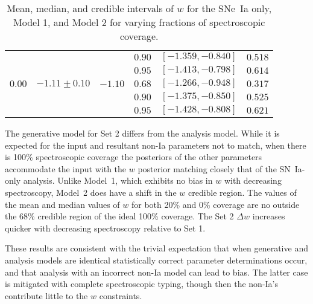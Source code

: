 \documentclass[preprint,3p]{elsarticle}
\begin{document}
\begin{table}
\begin{tabular}{|c|cc|ccc|}
& & &$0.90$ & $[-1.359, -0.840]$ & $0.518$ \\
& & &$0.95$ & $[-1.413, -0.798]$ & $0.614$ \\
\hline
$0.00$ &$-1.11 \pm  0.10$ & $-1.10$ &$0.68$ & $[-1.266, -0.948]$ & $0.317$ \\
& & &$0.90$ & $[-1.375, -0.850]$ & $0.525$ \\
& & &$0.95$ & $[-1.428, -0.808]$ & $0.621$ \\
\hline
\end{tabular}
\caption{Mean, median, and credible intervals of $w$ for the SNe~Ia only,
Model 1, and Model 2 for varying
fractions of spectroscopic coverage. \label{seed2:tab}}
\end{table}

The generative model for Set 2 differs from the analysis model.
While it is expected for the input and resultant non-Ia parameters not to match, 
when there is 100\% spectroscopic coverage the posteriors of the other
parameters accommodate the input with the $w$ posterior matching
closely that of the SN~Ia-only analysis.  Unlike Model~1, which exhibits no bias
in $w$ with decreasing spectroscopy, Model~2 does have a shift in the $w$
credible region.  
The values of the mean and median values of
$w$ for both 20\% and 0\% coverage are no outside the 68\%
credible region of the ideal 100\% coverage.
The Set 2 $\Delta w$ increases quicker with decreasing spectroscopy
relative to Set 1.

These results are consistent with the trivial expectation that when generative
and analysis models are identical statistically correct parameter determinations
occur, and that analysis with an incorrect non-Ia model can lead to bias.
The latter case is mitigated with complete spectroscopic typing, though then
the non-Ia's contribute little to the $w$ constraints. 
\end{document}
